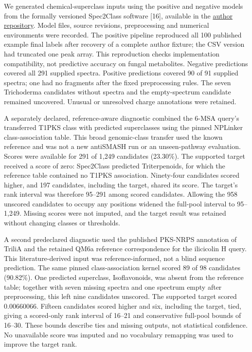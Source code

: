 \documentclass[
  10pt,
  a4paper,
]{article}
\begin{document}
We generated chemical-superclass inputs using the positive and negative models from the formally versioned Spec2Class software {[}16{]}, available in the \href{https://github.com/VickiPol/Spec2Class/tree/21c6f9433227c689d00549eae25e1fa2d4238fc3}{author repository}. Model files, source revisions, preprocessing and numerical environments were recorded. The positive pipeline reproduced all 100 published example final labels after recovery of a complete author fixture; the CSV version had truncated one peak array. This reproduction checks implementation compatibility, not predictive accuracy on fungal metabolites. Negative predictions covered all 291 supplied spectra. Positive predictions covered 90 of 91 supplied spectra; one had no fragments after the fixed preprocessing rules. The seven Trichoderma candidates without spectra and the empty-spectrum candidate remained uncovered. Unusual or unresolved charge annotations were retained.

A separately declared, reference-aware diagnostic combined the 6-MSA query's transferred T1PKS class with predicted superclasses using the pinned NPLinker class-association table. This broad genomic-class transfer used the known reference and was not a new antiSMASH run or an unseen-pathway evaluation. Scores were available for 291 of 1,249 candidates (23.30\%). The supported target received a score of zero: Spec2Class predicted Triterpenoids, for which the reference table contained no T1PKS association. Ninety-four candidates scored higher, and 197 candidates, including the target, shared its score. The target's rank interval was therefore 95--291 among scored candidates. Allowing the 958 unscored candidates to occupy any positions widened the full-pool interval to 95--1,249. Missing scores were not imputed, and the target result was retained without changing classes or thresholds.

A second predeclared diagnostic used the published PKS-NRPS annotation of TriliA and the retained QM6a reference correspondence for the ilicicolin H query. This literature-derived input was reference-informed, not a blind sequence prediction. The same pinned class-association kernel scored 89 of 98 candidates (90.82\%). One predicted superclass, Isoflavonoids, was absent from the reference table; together with seven missing spectra and one spectrum empty after preprocessing, this left nine candidates unscored. The supported target scored 0.00660066. Fifteen candidates scored higher and six, including the target, tied, giving a scored-only rank interval of 16--21 and conservative full-pool bounds of 16--30. These bounds describe ties and missing outputs, not statistical confidence. No unavailable score was imputed and no vocabulary remapping was used to improve the target rank.
\end{document}
